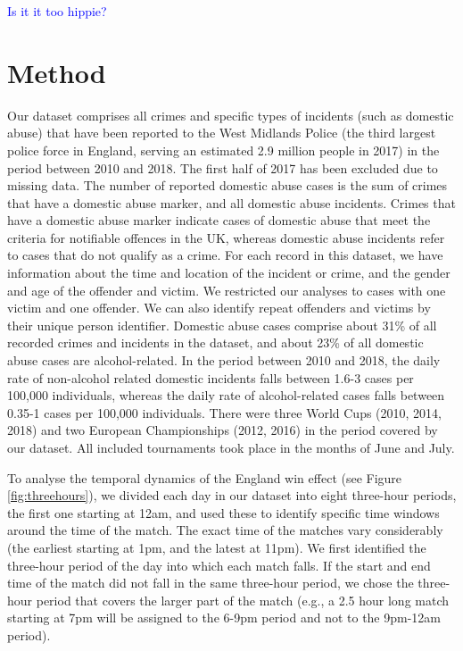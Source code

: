 \documentclass[12pt, letterpaper]{article}
\newcommand{\AT}[1] {{\textcolor{blue}{#1}}}
\begin{document}
\AT{Is it it too hippie?}


\newpage

\section{Method}

Our dataset comprises all crimes and specific types of incidents (such as domestic abuse) that have been reported to the West Midlands Police (the third largest police force in England\autocite{Homeoffice}, serving an estimated 2.9 million people in 2017\autocite{populationfigure}) in the period between 2010 and 2018. The first half of 2017 has been excluded due to missing data. The number of reported domestic abuse cases is the sum of crimes that have a domestic abuse marker, and all domestic abuse incidents. Crimes that have a domestic abuse marker indicate cases of domestic abuse that meet the criteria for notifiable offences in the UK, whereas domestic abuse incidents refer to cases that do not qualify as a crime. For each record in this dataset, we have information about the time and location of the incident or crime, and the gender and age of the offender and victim. We restricted our analyses to cases with one victim and one offender. We can also identify repeat offenders and victims by their unique person identifier. Domestic abuse cases comprise about 31\% of all recorded crimes and incidents in the dataset, and about 23\% of all domestic abuse cases are alcohol-related. In the period between 2010 and 2018, the daily rate of non-alcohol related domestic incidents falls between 1.6-3 cases per 100,000 individuals, whereas the daily rate of alcohol-related cases falls between 0.35-1 cases per 100,000 individuals. There were three World Cups (2010, 2014, 2018) and two European Championships (2012, 2016) in the period covered by our dataset. All included tournaments took place in the months of June and July.

 To analyse the temporal dynamics of the England win effect (see Figure \ref{fig:threehours}), we divided each day in our dataset into eight three-hour periods, the first one starting at 12am, and used these to identify specific time windows around the time of the match. The exact time of the matches vary considerably (the earliest starting at 1pm, and the latest at 11pm). We first identified the three-hour period of the day into which each match falls. If the start and end time of the match did not fall in the same three-hour period, we chose the three-hour period that covers the larger part of the match (e.g., a 2.5 hour long match starting at 7pm will be assigned to the 6-9pm period and not to the 9pm-12am period).
\end{document}
